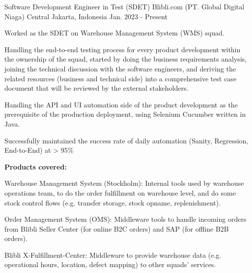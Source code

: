 

\begin{cventries}

  \cventry
    {Software Development Engineer in Test (SDET)} %
    {Blibli.com (PT. Global Digital Niaga)} %
    {Central Jakarta, Indonesia} %
    {Jan. 2023 - Present} %
    {
      \begin{cvitems}
        \item {Worked as the SDET on Warehouse Management System (WMS) squad.}
        \item {Handling the end-to-end testing process for every product development within the ownership of the squad, started by doing the business requirements analysis, joining the technical discussion with the software engineers, and deriving the related resources (business and technical side) into a comprehensive test case document that will be reviewed by the external stakeholders.}
        \item {Handling the API and UI automation side of the product development as the prerequisite of the production deployment, using Selenium Cucumber written in Java.}
        \item {Successfully maintained the success rate of daily automation (Sanity, Regression, End-to-End) at > 95\%}
        \item {\textbf{Products covered:}
          \begin{cvsubitems}
            \item {Warehouse Management System (Stockholm): Internal tools used by warehouse operations team, to do the order fulfillment on warehouse level, and do some stock control flows (e.g. transfer storage, stock opname, replenishment).}
            \item {Order Management System (OMS): Middleware tools to handle incoming orders from Blibli Seller Center (for online B2C orders) and SAP (for offline B2B orders).}
            \item {Blibli X-Fulfillment-Center: Middleware to provide warehouse data (e.g. operational hours, location, defect mapping) to other squads' services.}

\end{cvsubitems}}
\end{cvitems}}
\end{cventries}
